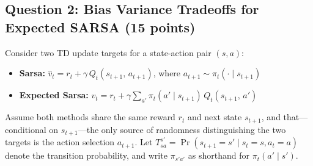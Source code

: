 \documentclass[12pt]{article}
\begin{document}
    


\subsection*{Question 2: Bias Variance Tradeoffs for Expected SARSA (15 points)}

Consider two TD update targets for a state-action pair $(s, a)$:
\begin{itemize}[nosep]
    \item \textbf{Sarsa:} \quad $\hat{v}_t = r_t + \gamma\, Q_t(s_{t+1},\, a_{t+1})$, \; where $a_{t+1} \sim \pi_t(\cdot \mid s_{t+1})$
    \item \textbf{Expected Sarsa:} \quad $v_t = r_t + \gamma \displaystyle\sum_{a'} \pi_t(a' \mid s_{t+1})\, Q_t(s_{t+1},\, a')$
\end{itemize}

Assume both methods share the same reward $r_t$ and next state $s_{t+1}$, and that---conditional on $s_{t+1}$---the only source of randomness distinguishing the two targets is the action selection $a_{t+1}$.  Let $T^{s'}_{sa} = \Pr(s_{t+1} = s' \mid s_t = s, a_t = a)$ denote the transition probability, and write $\pi_{s'a'}$ as shorthand for $\pi_t(a' \mid s')$.

\bigskip
\end{document}
